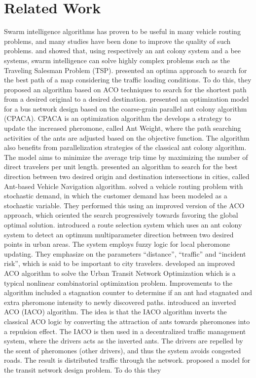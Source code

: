 \section{Related Work}


Swarm intelligence algorithms has proven to be useful in many vehicle routing problems, and many studies have been done to improve the quality of such problems. \citet{dorigo97} and \citet{lucic03} showed that, using respectively an ant colony system and a bee systems, swarm intelligence can solve highly complex problems such as the Traveling Salesman Problem (TSP). \citet{hsiao04} presented an optima approach to search for the best path of a map considering the traffic loading conditions. To do this, they proposed an algorithm based on ACO techniques to search for the shortest path from a desired original to a desired destination. \citet{yang07} presented an optimization model for a bus network design based on the coarse-grain parallel ant colony algorithm (CPACA). CPACA is an optimization algorithm the develops a strategy to update the increased pheromone, called Ant Weight, where the path searching activities of the ants are adjusted based on the objective function. The algorithm also benefits from parallelization strategies of the classical ant colony algorithm. The model aims to minimize the average trip time by maximizing the number of direct travelers per unit length. \citet{salehi-nezhad07} presented an algorithm to search for the best direction between two desired origin and destination intersections in cities, called Ant-based Vehicle Navigation algorithm. \citet{tripathi09} solved a vehicle routing problem with stochastic demand, in which the customer demand has been modeled as a stochastic variable. They performed this using an improved version of the ACO approach, which oriented the search progressively towards favoring the global optimal solution. \citet{salehinejad10} introduced a route selection system which uses an ant colony system to detect an optimum multiparameter direction between two desired points in urban areas. The system employs fuzzy logic for local pheromone updating. They emphasize on the parameters ``distance'', ``traffic'' and ``incident risk'', which is said to be important to city travelers. \citet{jiang10} developed an improved ACO algorithm to solve the Urban Transit Network Optimization which is a typical nonlinear combinatorial optimization problem. Improvements to the algorithm included a stagnation counter to determine if an ant had stagnated and extra pheromone intensity to newly discovered paths. \citet{dias14} introduced an inverted ACO (IACO) algorithm. The idea is that the IACO algorithm inverts the classical ACO logic by converting the attraction of ants towards pheromones into a repulsion effect. The IACO is then used in a decentralized traffic management system, where the drivers acts as the inverted ants. The drivers are repelled by the scent of pheromones (other drivers), and thus the system avoids congested roads. The result is distributed traffic through the network. \citet{nikolic14} proposed a model for the transit network design problem. To do this they 